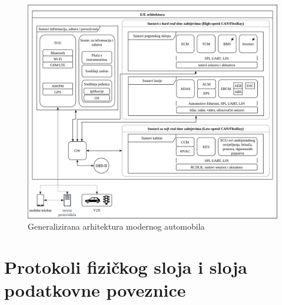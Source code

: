 \documentclass[times, utf8, diplomski, numeric]{fer}
\begin{document}
\begin{figure}[htb]
\centering
\includegraphics[width=\textwidth]{arhitektura.png}
\caption{Generalizirana arhitektura modernog automobila}
\label{fig:arhitektura}
\end{figure}
\newpage
\section{Protokoli fizičkog sloja i sloja podatkovne poveznice}
\end{document}
